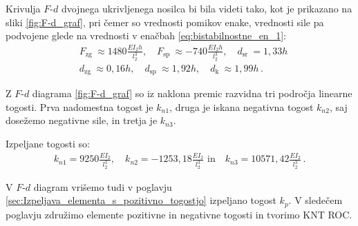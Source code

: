         \newpage
        Krivulja $F$-$d$ dvojnega ukrivljenega nosilca bi bila videti tako, kot je prikazano na sliki  \ref{fig:F-d_graf}, pri čemer so vrednosti pomikov enake, vrednosti sile pa podvojene glede na vrednosti v enačbah \eqref{eq:bistabilnostne_en_1}: 
        \begin{equation}
            \begin{aligned}
            &F_{\text {zg }} \approx 1480 \frac{E I_2 h}{l_2^3}, \quad F_{\text {sp }} \approx -740 \frac{E I_2 h}{l_2^3}, \quad d_{\text {sr }}=1,33 h \\
            &d_{\text {zg }} \approx 0,16 h, \quad d_{\text {sp }} \approx 1,92 h, \quad d_{\text {k }} \approx 1,99 h \,.
            \end{aligned}
        \end{equation}
        
        Z $F$-$d$ diagrama \ref{fig:F-d_graf} so iz naklona premic razvidna tri področja linearne togosti. Prva nadomestna togost je $k_{n1}$, druga je iskana negativna togost $k_{n2}$, saj dosežemo negativne sile, in tretja je $k_{n3}$. 
        
        Izpeljane togosti so:
        \begin{equation}\label{eq:kn}
            \begin{gathered}
            k_{n 1}=9250 \frac{E I_2}{l_2^3}, \quad k_{n 2}=-1253,18 \frac{E I_2}{l_2^3} \text{ in} \quad k_{n 3}=10571,42 \frac{E I_2}{l_2^3}\,.
            \end{gathered}
        \end{equation}
        
        V $F$-$d$ diagram vrišemo tudi v poglavju \ref{sec:Izpeljava_elementa_s_pozitivno_togostjo} izpeljano togost $k_p$. V sledečem poglavju združimo elemente pozitivne in negativne togosti in tvorimo KNT ROC.
        

